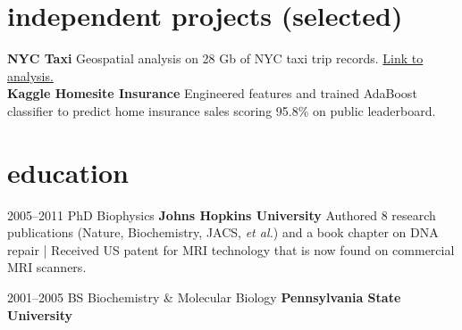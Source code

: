 \documentclass[]{friggeri-cv} %
\begin{document}
\section{independent projects (selected)}
\textbf {{NYC Taxi}} Geospatial analysis on 28 Gb of NYC taxi trip records.  \href{http://jfried23.github.io/webpage/}{Link to analysis.}\\
\textbf{{Kaggle Homesite Insurance}}  Engineered features and trained AdaBoost classifier to predict home insurance sales scoring 95.8\% on public leaderboard. \\


\section{education}

\begin{entrylist}


\entry
{2005--2011}
{PhD {\normalfont Biophysics}}
{\textbf{Johns Hopkins University}}
{Authored 8 research publications (Nature, Biochemistry, JACS, \textit{et al.}) and a book chapter on DNA repair | Received US patent for MRI technology that is now found on commercial MRI scanners.}


\entry
{2001--2005}
{BS {\normalfont Biochemistry \& Molecular Biology}}
{\textbf{Pennsylvania State University}}
{}


\end{entrylist}
\end{document}
